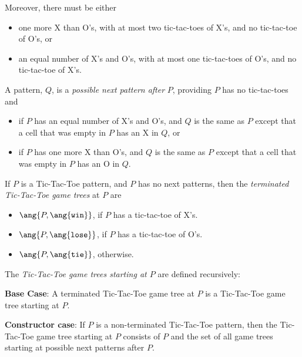 \begin{definition}
\begin{definition}
\begin{staffnotes}
Moreover, there must be either
\begin{itemize}

\item one more X than O's, with at most two tic-tac-toes of X's, and no
tic-tac-toe of O's, or

\item an equal number of X's and O's, with at most one tic-tac-toes of
O's, and no tic-tac-toe of X's.
\end{itemize}

\end{staffnotes}

A pattern, $Q$, is a \emph{possible next pattern after} $P$, providing $P$
has no tic-tac-toes and
\begin{itemize}

\item if $P$ has an equal number of X's and O's, and $Q$ is the same as
$P$ except that a cell that was empty in $P$ has an X in $Q$, or

\item if $P$ has one more X than O's, and $Q$ is the same as $P$ except
that a cell that was empty in $P$ has an O in $Q$.
\end{itemize}

If $P$ is a Tic-Tac-Toe pattern, and $P$ has no next patterns, then the
\emph{terminated Tic-Tac-Toe game trees} at $P$ are

\begin{itemize}

\item 
$\ang{P, \ang{\texttt{win}}}$,
if $P$ has a tic-tac-toe of X's.


\item 
$\ang{P, \ang{\texttt{lose}}}$, if $P$ has a tic-tac-toe of O's.


\item $\ang{P, \ang{\texttt{tie}}}$, otherwise.

\end{itemize}

\iffalse
If $Q$ is a possible move from $P$, then the game tree starting at $Q$ is
called a \emph{  Notice
that $\mathcal{G}_P = \emptyset$ iff $P$ is terminated.}
\fi

The \emph{Tic-Tac-Toe game trees starting at $P$} are defined recursively:

\textbf{Base Case}:
A terminated Tic-Tac-Toe game tree at $P$ is a Tic-Tac-Toe game tree
starting at $P$.

\textbf{Constructor case}: If $P$ is a non-terminated Tic-Tac-Toe pattern,
then the Tic-Tac-Toe game tree starting at $P$ consists of $P$ and the set
of all game trees starting at possible next patterns after $P$.
\end{definition}


\end{definition}
